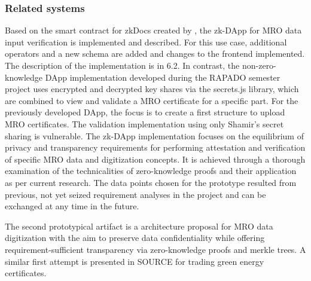 \subsubsection{Related systems}
Based on the smart contract for zkDocs created by \citep{zkdocs}, the zk-DApp for MRO data input verification is implemented and described. For this use case, additional operators and a new schema are added and changes to the frontend implemented. The description of the implementation is in 6.2. In contrast, the non-zero-knowledge DApp implementation developed during the RAPADO semester project uses encrypted and decrypted key shares via the secrets.js library, which are combined to view and validate a MRO certificate for a specific part. For the previously developed DApp, the focus is to create a first structure to upload MRO certificates. The validation implementation using only Shamir's secret sharing is vulnerable. The zk-DApp implementation focuses on the equilibrium of privacy and transparency requirements for performing attestation and verification of specific MRO data and digitization concepts. It is achieved through a thorough examination of the technicalities of zero-knowledge proofs and their application as per current research. The data points chosen for the prototype resulted from previous, not yet seized requirement analyses in the project and can be exchanged at any time in the future. 

The second prototypical artifact is a architecture proposal for MRO data digitization with the aim to preserve data confidentiality while offering requirement-sufficient transparency via zero-knowledge proofs and merkle trees. A similar first attempt is presented in SOURCE for trading green energy certificates. 
